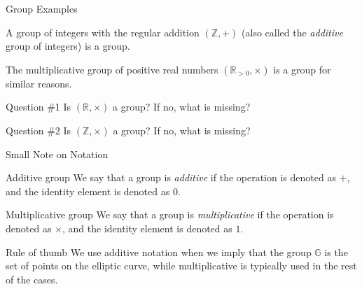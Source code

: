 \documentclass{beamer}
\begin{document}
    \begin{frame}{Group Examples}
      \begin{example}
        A group of integers with the regular addition $(\mathbb{Z},+)$ (also called the \textit{additive} group of integers) is a group.
      \end{example}
      \pause
      
      \begin{example}
          The multiplicative group of positive real numbers $(\mathbb{R}_{> 0}, \times)$ is a group for similar reasons. 
      \end{example}
      \pause

      \begin{alertblock}{Question \#1}
          Is $(\mathbb{R}, \times)$ a group? If no, what is missing?
      \end{alertblock}
      \pause

      \begin{alertblock}{Question \#2}
        Is $(\mathbb{Z}, \times)$ a group? If no, what is missing?
      \end{alertblock}
    \end{frame}

    \begin{frame}{Small Note on Notation}
      \begin{block}{Additive group}
          We say that a group is \textit{additive} if the operation is denoted as $+$, and the identity element is denoted as $0$.
      \end{block}
      \pause

      \begin{block}{Multiplicative group}
          We say that a group is \textit{multiplicative} if the operation is denoted as $\times$, and the identity element is denoted as $1$.
      \end{block}
      \pause

      \begin{block}{Rule of thumb}
        We use additive notation when we imply that the group $\mathbb{G}$ is the set of points on the elliptic curve, while multiplicative is typically used in the rest of the cases.
      \end{block}
  \end{frame}
\end{document}
